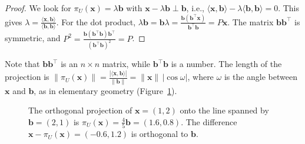 \documentclass[11pt]{article}
\newcommand{\norm}[1]{\lVert #1 \rVert}
\newcommand{\ip}[2]{\langle #1, #2 \rangle}
\theoremstyle{definition}
\theoremstyle{plain}
\theoremstyle{remark}
\DeclareMathOperator{\Span}{span}
\begin{document}
\begin{proof}
    We look for $\pi_U(\mathbf{x}) = \lambda \mathbf{b}$ with $\mathbf{x} - \lambda \mathbf{b} \perp \mathbf{b}$, i.e., $\ip{\mathbf{x}}{\mathbf{b}} - \lambda \ip{\mathbf{b}}{\mathbf{b}} = 0$. This gives $\lambda = \frac{\ip{\mathbf{x}}{\mathbf{b}}}{\ip{\mathbf{b}}{\mathbf{b}}}$. For the dot product, $\lambda \mathbf{b} = \mathbf{b} \lambda = \frac{\mathbf{b} (\mathbf{b}^\top \mathbf{x})}{\mathbf{b}^\top \mathbf{b}} = P\mathbf{x}$. The matrix $\mathbf{b} \mathbf{b}^\top$ is symmetric, and $P^2 = \frac{\mathbf{b} (\mathbf{b}^\top \mathbf{b}) \mathbf{b}^\top}{(\mathbf{b}^\top \mathbf{b})^2} = P$.
\end{proof}

Note that $\mathbf{b}\mathbf{b}^\top$ is an $n \times n$ matrix, while $\mathbf{b}^\top \mathbf{b}$ is a number. The length of the projection is $\norm{\pi_U(\mathbf{x})} = \frac{|\ip{\mathbf{x}}{\mathbf{b}}|}{\norm{\mathbf{b}}} = \norm{\mathbf{x}} \, |\cos\omega|$, where $\omega$ is the angle between $\mathbf{x}$ and $\mathbf{b}$, as in elementary geometry (Figure~\ref{fig:projection-line}).

\begin{figure}[ht]
    \centering
    \caption[Projection onto a line]{The orthogonal projection of $\mathbf{x} = (1, 2)$ onto the line spanned by $\mathbf{b} = (2, 1)$ is $\pi_U(\mathbf{x}) = \frac{4}{5} \mathbf{b} = (1.6, 0.8)$. The difference $\mathbf{x} - \pi_U(\mathbf{x}) = (-0.6, 1.2)$ is orthogonal to $\mathbf{b}$.}
    \label{fig:projection-line}
\end{figure}
\end{document}
